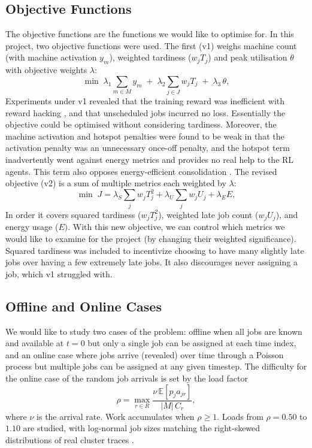 \documentclass[12pt]{article}
\begin{document}
\subsection{Objective Functions}
The objective functions are the functions we would like to optimise for. In this project, two objective functions were used. The first (v1) weighs machine count (with machine activation $y_m$), weighted tardiness ($w_jT_j$) and peak utilisation $\theta$ with objective weights $\lambda$:
\begin{equation}\label{eq: Initial Objective Function}
      \min \; \lambda_1 \sum_{m \in M} y_m \;+\; \lambda_2 \sum_{j \in J}
  w_j T_j \;+\; \lambda_3\, \theta,
  \end{equation}
Experiments under v1 revealed that the training reward was inefficient with reward hacking \cite{skalse2022rewardhacking}, and that unscheduled jobs incurred no loss. Essentially the objective could be optimised without considering tardiness. Moreover, the machine activation and hotspot penalties were found to be weak in that the activation penalty was an unnecessary once-off penalty, and the hotspot term inadvertently went against energy metrics and provides no real help to the RL agents. This term also opposes energy-efficient consolidation \cite{energyaware2012, fan2007powerprovisioning}. The revised objective (v2) is a sum of multiple metrics each weighted by $\lambda$:
\begin{equation}\label{eq:objective-v2}
    \min \; J = \lambda_S \sum_{j} w_j T_j^{2}
              + \lambda_U \sum_{j} w_j U_j + \lambda_E E,
\end{equation}
In order it covers squared tardiness ($w_j T_j^{2}$), weighted late job count ($w_jU_j$), and energy usage ($E)$. With this new objective, we can control which metrics we would like to examine for the project (by changing their weighted significance). Squared tardiness was included to incentivize choosing to have many slightly late jobs over having a few extremely late jobs. It also discourages never assigning a job, which v1 struggled with.

\subsection{Offline and Online Cases}
We would like to study two cases of the problem: offline when all jobs are known and available at $t=0$ but only a single job can be assigned at each time index, and an online case where jobs arrive (revealed) over time through a Poisson process \cite{kleinrock1975queueing, mao2016deeprm} but multiple jobs can be assigned at any given timestep. 
\newline
The difficulty for the online case of the random job arrivals is set by the load factor
\begin{equation}\label{eq:rho}
    \rho = \max_{r \in R} \frac{\nu\, \mathbb{E}[p_j a_{jr}]}{|M|\, C_r},
\end{equation}
where $\nu$ is the arrival rate. Work accumulates when $\rho\ge1$. Loads from $\rho = 0.50$ to $1.10$ are studied, with log-normal job sizes matching the right-skewed distributions of real cluster traces \cite{reiss2012googletrace, cortez2017resourcecentral}.
\end{document}
